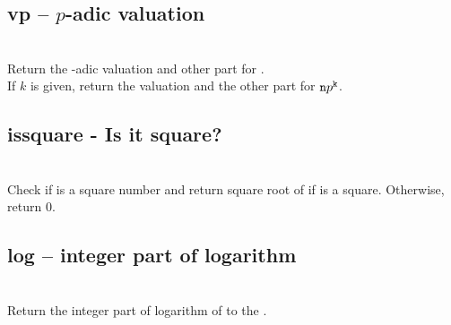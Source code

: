 \subsection{vp -- $p$-adic valuation}
\\
\spacing
\quad Return the -adic valuation and other part for .\\
\spacing
\quad \negok If $k$ is given, return the valuation and the other part for ${\texttt n}p^{\texttt k}$.\\
%
\subsection{issquare - Is it square?}
\\
\spacing
\quad Check if  is a square number and return square root
of  if  is a square.
Otherwise, return \(0\).\\
%
\subsection{log -- integer part of logarithm}
\\
\spacing
\quad Return the integer part of logarithm of  to the .\\
%
